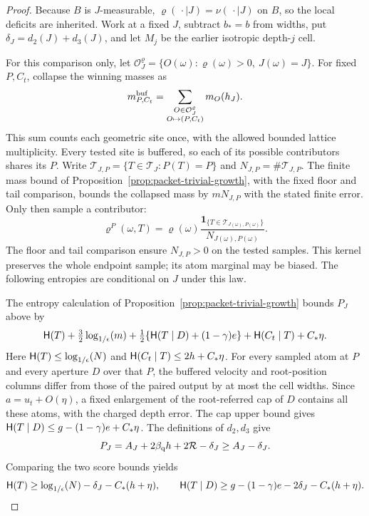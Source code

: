 \begin{proof}
Because \(B\) is \(J\)-measurable,
\(\varrho(\,\cdot\mid J)=\nu(\,\cdot\mid J)\) on \(B\), so the
local deficits are inherited.  Work at a fixed \(J\), subtract
\(b_*=b\) from widths, put \(\delta_J=d_2(J)+d_3(J)\), and let
\(M_j\) be the earlier isotropic depth-\(j\) cell.

For this comparison only, let
\(\mathcal O_J^\varrho=\{O(\omega):\varrho(\omega)>0,\ J(\omega)=J\}\).
For fixed \(P,C_t\), collapse the winning masses as
\[
 m^{\rm buf}_{P,C_t}
 =\sum_{\substack{O\in\mathcal O_J^\varrho\\O\mapsto(P,C_t)}}m_O(h_J).
\]
This sum counts each geometric site once, with the allowed bounded
lattice multiplicity.  Every tested site is buffered, so each of
its possible contributors shares its \(P\).  Write
\(\mathcal T_{J,P}=\{T\in\mathcal T_J:P(T)=P\}\) and
\(N_{J,P}=\#\mathcal T_{J,P}\).  The finite mass bound of
Proposition~\ref{prop:packet-trivial-growth}, with the fixed floor
and tail comparison, bounds the collapsed mass by \(mN_{J,P}\)
with the stated finite error.  Only then sample a contributor:
\[
 \varrho^P(\omega,T)=\varrho(\omega)
   \frac{\boldsymbol1_{\{T\in\mathcal T_{J(\omega),P(\omega)}\}}}
        {N_{J(\omega),P(\omega)}}.
\]
The floor and tail comparison ensure \(N_{J,P}>0\) on the tested
samples.  This kernel preserves the whole endpoint sample; its
atom marginal may be biased.  The following entropies are
conditional on \(J\) under this law.

The entropy calculation of
Proposition~\ref{prop:packet-trivial-growth} bounds \(P_J\) above by
\[
 \mathsf H(T)+\tfrac32\log_{1/\epsilon}\!\left(m\right)+
 \tfrac12\{\mathsf H(T\mid D)+(1-\gamma)e\}
 +\mathsf H(C_t\mid T)+C_*\eta.
\]
Here \(\mathsf H(T)\le\log_{1/\epsilon}\!\left(N\right)\) and
\(\mathsf H(C_t\mid T)\le2h+C_*\eta\).  For every sampled atom at \(P\)
and every aperture \(D\) over that \(P\), the buffered velocity and
root-position columns differ from those of the paired output by
at most the cell widths.  Since \(a=u_t+O(\eta)\), a fixed
enlargement of the root-referred cap of \(D\) contains all these
atoms, with the charged depth error.  The cap upper bound gives
\(\mathsf H(T\mid D)\le g-(1-\gamma)e+C_*\eta\).
The definitions of \(d_2,d_3\) give
\[
 P_J=A_J+2\beta_{\mathrm q} h+2\mathcal R-\delta_J\ge A_J-\delta_J.
\]
Comparing the two score bounds yields
\begin{equation}
 \mathsf H(T)\ge\log_{1/\epsilon}\!\left(N\right)-\delta_J-C_*(h+\eta),\qquad
 \mathsf H(T\mid D)\ge g-(1-\gamma)e-2\delta_J-C_*(h+\eta).
 \label{eq:alignment-biased-entropy}
\end{equation}


\end{proof}
